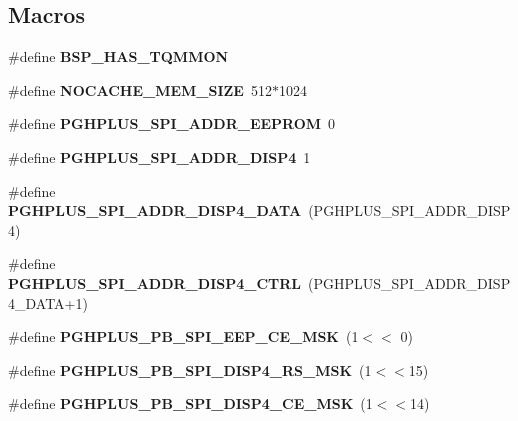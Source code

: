 \subsection*{Macros}
\begin{DoxyCompactItemize}
\item 
\mbox{\label{group__RTEMSBSPsPowerPCTQM8XX_gac7d594b9c1d86dee7927067af792ca34}} 
\#define {\bfseries B\+S\+P\+\_\+\+H\+A\+S\+\_\+\+T\+Q\+M\+M\+ON}
\item 
\mbox{\label{group__RTEMSBSPsPowerPCTQM8XX_ga97834ea41edc77b53711fd3004fa0a41}} 
\#define {\bfseries N\+O\+C\+A\+C\+H\+E\+\_\+\+M\+E\+M\+\_\+\+S\+I\+ZE}~512$\ast$1024
\item 
\mbox{\label{group__RTEMSBSPsPowerPCTQM8XX_ga8ed1f4614c64c31b651a9f61d2db97dd}} 
\#define {\bfseries P\+G\+H\+P\+L\+U\+S\+\_\+\+S\+P\+I\+\_\+\+A\+D\+D\+R\+\_\+\+E\+E\+P\+R\+OM}~0
\item 
\mbox{\label{group__RTEMSBSPsPowerPCTQM8XX_gac896e4683fe411dd1ce096c0875c7254}} 
\#define {\bfseries P\+G\+H\+P\+L\+U\+S\+\_\+\+S\+P\+I\+\_\+\+A\+D\+D\+R\+\_\+\+D\+I\+S\+P4}~1
\item 
\mbox{\label{group__RTEMSBSPsPowerPCTQM8XX_ga2d8c01f62f074dde6aa4216ae55982b3}} 
\#define {\bfseries P\+G\+H\+P\+L\+U\+S\+\_\+\+S\+P\+I\+\_\+\+A\+D\+D\+R\+\_\+\+D\+I\+S\+P4\+\_\+\+D\+A\+TA}~(P\+G\+H\+P\+L\+U\+S\+\_\+\+S\+P\+I\+\_\+\+A\+D\+D\+R\+\_\+\+D\+I\+S\+P4)
\item 
\mbox{\label{group__RTEMSBSPsPowerPCTQM8XX_gaffea38cdf3b723163cc9cb3a086f85eb}} 
\#define {\bfseries P\+G\+H\+P\+L\+U\+S\+\_\+\+S\+P\+I\+\_\+\+A\+D\+D\+R\+\_\+\+D\+I\+S\+P4\+\_\+\+C\+T\+RL}~(P\+G\+H\+P\+L\+U\+S\+\_\+\+S\+P\+I\+\_\+\+A\+D\+D\+R\+\_\+\+D\+I\+S\+P4\+\_\+\+D\+A\+TA+1)
\item 
\mbox{\label{group__RTEMSBSPsPowerPCTQM8XX_gaa06f0dc50fc7860284d97df9cf6bf075}} 
\#define {\bfseries P\+G\+H\+P\+L\+U\+S\+\_\+\+P\+B\+\_\+\+S\+P\+I\+\_\+\+E\+E\+P\+\_\+\+C\+E\+\_\+\+M\+SK}~(1$<$$<$ 0)
\item 
\mbox{\label{group__RTEMSBSPsPowerPCTQM8XX_ga3282814ae0fc8197c61fdb2dfce43562}} 
\#define {\bfseries P\+G\+H\+P\+L\+U\+S\+\_\+\+P\+B\+\_\+\+S\+P\+I\+\_\+\+D\+I\+S\+P4\+\_\+\+R\+S\+\_\+\+M\+SK}~(1$<$$<$15)
\item 
\mbox{\label{group__RTEMSBSPsPowerPCTQM8XX_gad0b44e28abf051cb90720d52ff777de6}} 
\#define {\bfseries P\+G\+H\+P\+L\+U\+S\+\_\+\+P\+B\+\_\+\+S\+P\+I\+\_\+\+D\+I\+S\+P4\+\_\+\+C\+E\+\_\+\+M\+SK}~(1$<$$<$14)
\end{DoxyCompactItemize}
